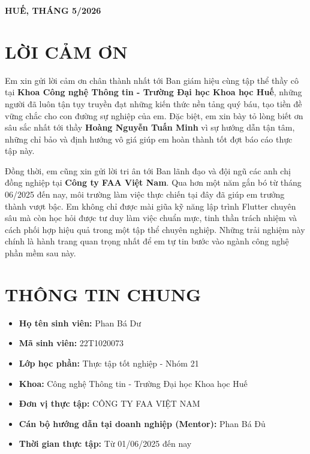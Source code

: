 \documentclass[12pt, a4paper]{article}
\begin{document}
\begin{titlepage}
    \vfill
    \begin{center}
        \textbf{HUẾ, THÁNG 5/2026}
    \end{center}
    \restoregeometry
\end{titlepage}

\newpage

\section*{LỜI CẢM ƠN}
Em xin gửi lời cảm ơn chân thành nhất tới Ban giám hiệu cùng tập thể thầy cô tại \textbf{Khoa Công nghệ Thông tin - Trường Đại học Khoa học Huế}, những người đã luôn tận tụy truyền đạt những kiến thức nền tảng quý báu, tạo tiền đề vững chắc cho con đường sự nghiệp của em. Đặc biệt, em xin bày tỏ lòng biết ơn sâu sắc nhất tới thầy \textbf{Hoàng Nguyễn Tuấn Minh} vì sự hướng dẫn tận tâm, những chỉ bảo và định hướng vô giá giúp em hoàn thành tốt đợt báo cáo thực tập này.

Đồng thời, em cũng xin gửi lời tri ân tới Ban lãnh đạo và đội ngũ các anh chị đồng nghiệp tại \textbf{Công ty FAA Việt Nam}. Qua hơn một năm gắn bó từ tháng 06/2025 đến nay, môi trường làm việc thực chiến tại đây đã giúp em trưởng thành vượt bậc. Em không chỉ được mài giũa kỹ năng lập trình Flutter chuyên sâu mà còn học hỏi được tư duy làm việc chuẩn mực, tinh thần trách nhiệm và cách phối hợp hiệu quả trong một tập thể chuyên nghiệp. Những trải nghiệm này chính là hành trang quan trọng nhất để em tự tin bước vào ngành công nghệ phần mềm sau này.

\newpage
\renewcommand{\contentsname}{MỤC LỤC}
\tableofcontents
\newpage


\section{THÔNG TIN CHUNG}
\begin{itemize}
    \item \textbf{Họ tên sinh viên:} Phan Bá Dư
    \item \textbf{Mã sinh viên:} 22T1020073
    \item \textbf{Lớp học phần:} Thực tập tốt nghiệp - Nhóm 21
    \item \textbf{Khoa:} Công nghệ Thông tin - Trường Đại học Khoa học Huế
    \item \textbf{Đơn vị thực tập:} CÔNG TY FAA VIỆT NAM
    \item \textbf{Cán bộ hướng dẫn tại doanh nghiệp (Mentor):} Phan Bá Đủ
    \item \textbf{Thời gian thực tập:} Từ 01/06/2025 đến nay
\end{itemize}
\end{document}
